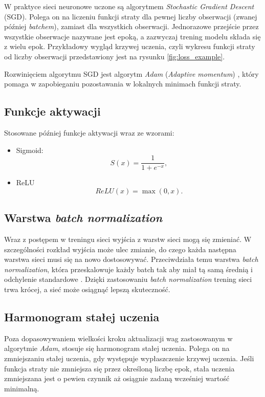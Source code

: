 \documentclass{pracalicmgr}
\begin{document}
	W praktyce sieci neuronowe uczone są algorytmem \textit{Stochastic Gradient Descent} (SGD). Polega on na liczeniu funkcji straty dla pewnej liczby obserwacji (zwanej później \textit{batchem}), zamiast dla wszystkich obserwacji. Jednorazowe przejście przez wszystkie obserwacje nazywane jest epoką, a zazwyczaj trening modelu składa się z wielu epok. Przykładowy wygląd krzywej uczenia, czyli wykresu funkcji straty od liczby obserwacji przedstawiony jest na rysunku \ref{fig:loss_example}.
	
	Rozwinięciem algorytmu SGD jest algorytm \textit{Adam} (\textit{Adaptive momentum}) \cite{adam}, który pomaga w zapobieganiu pozostawania w lokalnych minimach funkcji straty.
	
	\subsection{Funkcje aktywacji}
	Stosowane później funkcje aktywacji wraz ze wzorami:
	\begin{itemize}
	\item Sigmoid: $$S(x) = \frac{1}{1+e^{-x}},$$
	\item ReLU\cite{relu} $$ReLU(x) = \max(0, x).$$
	\end{itemize}
	
	\subsection{Warstwa \textit{batch normalization}}
	Wraz z postępem w treningu sieci wyjścia z warstw sieci mogą się zmieniać. W szczególności rozkład wyjścia może ulec zmianie, do czego każda następna warstwa sieci musi się na nowo dostosowywać. Przeciwdziała temu warstwa \textit{batch normalization}, która przeskalowuje każdy batch tak aby miał tą samą średnią i odchylenie standardowe \cite{batch_norm}. Dzięki zastosowaniu \textit{batch normalization} trening sieci trwa krócej, a sieć może osiągnąć lepszą skuteczność.
	
	\subsection{Harmonogram stałej uczenia}
	Poza dopasowywaniem wielkości kroku aktualizacji wag zastosowanym w algorytmie \textit{Adam}, stosuje się harmonogram stałej uczenia. Polega on na zmniejszaniu stałej uczenia, gdy występuje wypłaszczenie krzywej uczenia. Jeśli funkcja straty nie zmniejsza się przez określoną liczbę epok, stała uczenia zmniejszana jest o pewien czynnik aż osiągnie zadaną wcześniej wartość minimalną.
	
\end{document}
